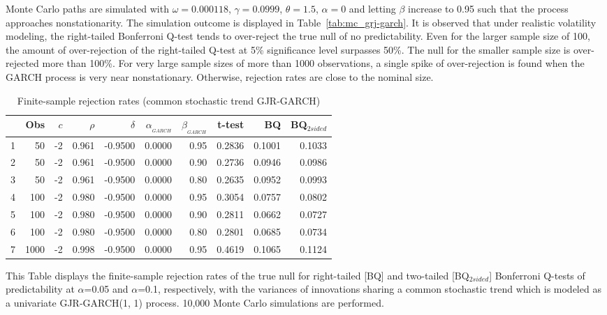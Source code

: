 \documentclass[11pt, a4paper]{article}
\begin{document}
Monte Carlo paths are simulated with $\omega = 0.000118$, $\gamma=0.0999$, $\theta=1.5$, $\alpha=0$ and letting $\beta$ increase to 0.95 such that the process approaches nonstationarity. The simulation outcome is displayed in Table~\vref{tab:mc_grj-garch}. It is observed that under realistic volatility modeling, the right-tailed Bonferroni Q-test tends to over-reject the true null of no predictability. Even for the larger sample size of 100, the amount of over-rejection of the right-tailed Q-test at 5\% significance level surpasses 50\%. The null for the smaller sample size is over-rejected more than 100\%. For very large sample sizes of more than 1000 observations, a single spike of over-rejection is found when the GARCH process is very near nonstationary. Otherwise, rejection rates are close to the nominal size.

\begin{table}[h!]
\centering
\caption{Finite-sample rejection rates (common stochastic trend GJR-GARCH)}
\label{tab:mc_grj-garch}
\begin{threeparttable}
\begin{tabular}{rrrrrrrrrr}
  \hline
  & Obs & $c$ & $\rho$ & $\delta$ & $\alpha_{_{GARCH}}$ & $\beta_{_{GARCH}}$ & t-test &BQ& BQ$_{{2sided}}$ \\ 
  \hline
1 & 50 & -2 & 0.961 & -0.9500 & 0.0000 & 0.95 & 0.2836 & 0.1001 & 0.1033 \\ 
  2 & 50 & -2 & 0.961 & -0.9500 & 0.0000 & 0.90 & 0.2736 & 0.0946 & 0.0986 \\ 
  3 & 50 & -2 & 0.961 & -0.9500 & 0.0000 & 0.80 & 0.2635 & 0.0952 & 0.0993 \\ 
  4 & 100 & -2 & 0.980 & -0.9500 & 0.0000 & 0.95 & 0.3054 & 0.0757 & 0.0802 \\ 
  5 & 100 & -2 & 0.980 & -0.9500 & 0.0000 & 0.90 & 0.2811 & 0.0662 & 0.0727 \\ 
  6 & 100 & -2 & 0.980 & -0.9500 & 0.0000 & 0.80 & 0.2801 & 0.0685 & 0.0734 \\ 
  7&1000 & -2 & 0.998 & -0.9500 & 0.0000 & 0.95 & 0.4619 & 0.1065 & 0.1124 \\ 
   \hline
\end{tabular}
 \begin{tablenotes}
 \small
\item This Table displays the finite-sample rejection rates of the true null for right-tailed [BQ] and two-tailed  [BQ$_{{2sided}}$] Bonferroni Q-tests of predictability at $\alpha$=0.05 and $\alpha$=0.1, respectively, with the variances of innovations sharing a common stochastic trend which is modeled as a univariate GJR-GARCH(1, 1) process. 10,000 Monte Carlo simulations are performed.
\end{tablenotes}
\end{threeparttable}
\end{table}
\end{document}
